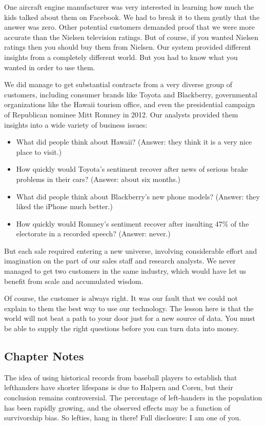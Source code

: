 \documentclass[10pt]{article}
\begin{document}
One aircraft engine manufacturer was very interested in learning how much the kids talked about them on Facebook. We had to break it to them gently that the answer was zero. Other potential customers demanded proof that we were more accurate than the Nielsen television ratings. But of course, if you wanted Nielsen ratings then you should buy them from Nielsen. Our system provided different insights from a completely different world. But you had to know what you wanted in order to use them.

We did manage to get substantial contracts from a very diverse group of customers, including consumer brands like Toyota and Blackberry, governmental organizations like the Hawaii tourism office, and even the presidential campaign of Republican nominee Mitt Romney in 2012. Our analysts provided them insights into a wide variety of business issues:

\begin{itemize}
  \item What did people think about Hawaii? (Answer: they think it is a very nice place to visit.)
  \item How quickly would Toyota's sentiment recover after news of serious brake problems in their cars? (Answer: about six months.)
  \item What did people think about Blackberry's new phone models? (Answer: they liked the iPhone much better.)
  \item How quickly would Romney's sentiment recover after insulting 47\% of the electorate in a recorded speech? (Answer: never.)
\end{itemize}

But each sale required entering a new universe, involving considerable effort and imagination on the part of our sales staff and research analysts. We never managed to get two customers in the same industry, which would have let us benefit from scale and accumulated wisdom.

Of course, the customer is always right. It was our fault that we could not explain to them the best way to use our technology. The lesson here is that the world will not beat a path to your door just for a new source of data. You must be able to supply the right questions before you can turn data into money.

\subsection{Chapter Notes}
The idea of using historical records from baseball players to establish that lefthanders have shorter lifespans is due to Halpern and Coren, but their conclusion remains controversial. The percentage of left-handers in the population has been rapidly growing, and the observed effects may be a function of survivorship bias. So lefties, hang in there! Full disclosure: I am one of you.
\end{document}
